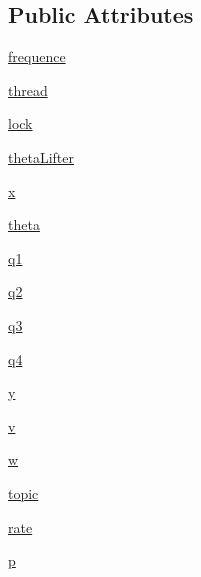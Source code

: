 \subsection*{Public Attributes}
\begin{DoxyCompactItemize}
\item 
\hyperlink{classcmd__TTB_1_1rosCom_1_1TurtlebotListener_a151f0bbf98f037cfbb7d4f37f24a41ce}{frequence}
\item 
\hyperlink{classcmd__TTB_1_1rosCom_1_1TurtlebotListener_a1b553612cfd5f7a036135d9d1ea6c8d4}{thread}
\item 
\hyperlink{classcmd__TTB_1_1rosCom_1_1TurtlebotListener_a38b4dd694dcbe7b0130c14b7c0d4258f}{lock}
\item 
\hyperlink{classcmd__TTB_1_1rosCom_1_1TurtlebotListener_a239216e633677cdfa9454413d5d25b7a}{theta\+Lifter}
\item 
\hyperlink{classcmd__TTB_1_1rosCom_1_1TurtlebotListener_a0f4a3af5847d9cc7286df47ff9c210ba}{x}
\item 
\hyperlink{classcmd__TTB_1_1rosCom_1_1TurtlebotListener_a2a84aa6fb1fa37ed9ebe192453595ee3}{theta}
\item 
\hyperlink{classcmd__TTB_1_1rosCom_1_1TurtlebotListener_a95654744b7edf1026dd83eb188362a16}{q1}
\item 
\hyperlink{classcmd__TTB_1_1rosCom_1_1TurtlebotListener_aaa33f36155d66b69c8ee6c42d3e41653}{q2}
\item 
\hyperlink{classcmd__TTB_1_1rosCom_1_1TurtlebotListener_a990048a7622c36d60e21db4095824da1}{q3}
\item 
\hyperlink{classcmd__TTB_1_1rosCom_1_1TurtlebotListener_a746a7fb8e2d8d8f36d450eed84f883c3}{q4}
\item 
\hyperlink{classcmd__TTB_1_1rosCom_1_1TurtlebotListener_a65dcdf893e0634569fb6ef82ee2b994b}{y}
\item 
\hyperlink{classcmd__TTB_1_1rosCom_1_1TurtlebotListener_ae4e7da79789355f09d2160df1a1a70e9}{v}
\item 
\hyperlink{classcmd__TTB_1_1rosCom_1_1TurtlebotListener_a42be0d63f609e68b70a368f6abfcf51c}{w}
\item 
\hyperlink{classcmd__TTB_1_1rosCom_1_1TurtlebotListener_ad2568a558e1f8eb925e740feecd64da8}{topic}
\item 
\hyperlink{classcmd__TTB_1_1rosCom_1_1TurtlebotListener_a0cc23ef555157723d4134bb26d4eb688}{rate}
\item 
\hyperlink{classcmd__TTB_1_1rosCom_1_1TurtlebotListener_ac7f613cf46497b805eb2c98a4d0b9140}{p}
\end{DoxyCompactItemize}


